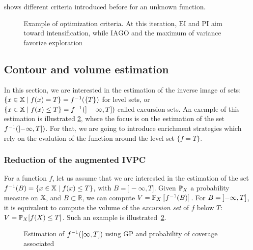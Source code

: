 \documentclass[../../Main_ManuscritThese.tex]{subfiles}
\newcommand\imgpath{/home/victor/acadwriting/Manuscrit/Text/Chapter4/img/}
\begin{document}
 shows different criteria
introduced before for an unknown function.
\begin{figure}[ht!]
  \centering
  
  \caption[Optimization criteria for GP]{\label{fig:example_optimization_criteria} Example of optimization criteria. At this iteration, $\mathrm{EI}$ and $\mathrm{PI}$ aim toward intensification, while $\mathrm{IAGO}$ and the maximum of variance favorize exploration}
\end{figure}

%
\subsection{Contour and volume estimation}
\label{sec:GP_vol_estim}
In this section, we are interested in the estimation of the inverse
image of sets: $\{x \in \mathbb{X} \mid f(x) = T\}=f^{-1}(\{T\})$ for
level sets, or
$\{x\in\mathbb{X} \mid f(x) \leq T\} = f^{-1}(]-\infty, T])$ called
excursion sets. An exemple of this estimation is illustrated
\cref{fig:prob_coverage_example}, where the focus is on the estimation
of the set $f^{-1}(\interval[open left]{-\infty}{T})$. For that, we
are going to introduce enrichment strategies which rely on the
evalution of the function around the level set $\{f=T\}$.

\subsubsection{Reduction of the augmented IVPC}
For a function $f$, let us assume that we are interested in the
estimation of the set
$f^{-1}(B) = \{x \in \mathbb{X} \mid f(x) \leq T\}$, with
$B = ]-\infty, T]$. Given $\mathbb{P}_{X}$ a probability
measure on $\mathbb{X}$, and $B\subset \mathbb{R}$, we can compute
$V=\mathbb{P}_{X}\left[f^{-1}(B)\right]$. For
$B = \interval[open left]{-\infty}{T}$, it is equivalent to compute the
volume of the \emph{excursion set} of $f$ below $T$:
$V=\mathbb{P}_{X}[f(X) \leq T]$. Such an example is illustrated~\cref{fig:prob_coverage_example}.%
\begin{figure}[ht]
  \centering
  
  \caption[Estimation of $f^{-1}(B)$ using GP]{\label{fig:prob_coverage_example} Estimation of $f^{-1}(\interval{\infty}{T})$ using GP and probability of coverage associated %
  }
\end{figure}
\end{document}
